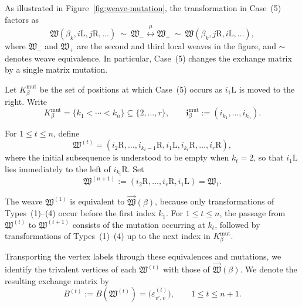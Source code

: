 \documentclass[12pt, reqno]{amsart}
\theoremstyle{plain}
\theoremstyle{definition}
\numberwithin{equation}{section}
\begin{document}
As illustrated in Figure~\ref{fig:weave-mutation}, the transformation
in Case~(5) factors as
\begin{equation}\label{eq:case5}
    \mathfrak W(\beta_k,i\mathrm L,j\mathrm R,\ldots)
    \ \sim\
    \mathfrak W_-
    \overset{\mu}{\longleftrightarrow}
    \mathfrak W_+
    \ \sim\
    \mathfrak W(\beta_k,j\mathrm R,i\mathrm L,\ldots),
\end{equation}
where \(\mathfrak W_-\) and \(\mathfrak W_+\) are the second and
third local weaves in the figure, and \(\sim\) denotes weave
equivalence. In particular, Case~(5) changes the exchange matrix by a
single matrix mutation.

Let \(K_\beta^{\mathrm{mut}}\) be the set of positions at which
Case~\textup{(5)} occurs as
\(i_1\mathrm L\) is moved to the right. Write
\begin{equation}\label{eq:K-beta-I-beta}
    K_\beta^{\mathrm{mut}}
    =\{k_1<\cdots<k_n\}\subseteq\{2,\ldots,r\},
    \qquad
    \mathbf i_\beta^{\mathrm{mut}}
    :=(i_{k_1},\ldots,i_{k_n}).
\end{equation}

For \(1\leq t\leq n\), define
\begin{equation}\label{eq:intermediate-right-inductive-weave}
    \mathfrak W^{(t)}
    =(i_2\mathrm R,\ldots,i_{k_t-1}\mathrm R,
      i_1\mathrm L,i_{k_t}\mathrm R,\ldots,i_r\mathrm R),
\end{equation}
where the initial subsequence is understood to be empty when \(k_t=2\),
so that \(i_1\mathrm L\) lies immediately to the left of
\(i_{k_t}\mathrm R\). Set
\begin{equation}\label{eq:last-intermediate-right-inductive-weave}
    \mathfrak W^{(n+1)}
    :=(i_2\mathrm R,\ldots,i_r\mathrm R,i_1\mathrm L)
    =\mathfrak W_1.
\end{equation}

The weave \(\mathfrak W^{(1)}\) is equivalent to
\(\overrightarrow{\mathfrak W}(\beta)\), because only
transformations of Types~(1)--(4) occur before the first index
\(k_1\). For \(1\leq t\leq n\), the passage from
\(\mathfrak W^{(t)}\) to \(\mathfrak W^{(t+1)}\) consists of the
mutation occurring at \(k_t\), followed by transformations of
Types~(1)--(4) up to the next index in
\(K_\beta^{\mathrm{mut}}\).

Transporting the vertex labels through these equivalences and
mutations, we identify the trivalent vertices of each
\(\mathfrak W^{(t)}\) with those of
\(\overrightarrow{\mathfrak W}(\beta)\). We denote the resulting
exchange matrix by
\begin{equation}\label{eq:intermediate-exchange-matrix}
    B^{(t)}:=B(\mathfrak W^{(t)})
    =\bigl(\varepsilon_{v',v}^{(t)}\bigr),
    \qquad 1\leq t\leq n+1.
\end{equation}
\end{document}
